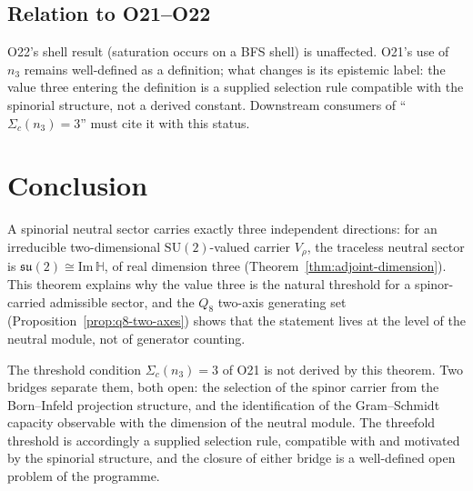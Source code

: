 \documentclass[11pt,a4paper]{article}
\newcommand{\ImH}{\mathrm{Im}\,\mathbb{H}}
\newcommand{\su}{\mathfrak{su}}
\newcommand{\SU}{\mathrm{SU}}
\begin{document}
  \subsection{Relation to O21--O22}
    \label{ssec:conditional}

    O22's shell result (saturation occurs on a BFS shell) is unaffected.
    O21's use of $n_{3}$ remains well-defined as a definition; what changes is its
    epistemic label: the value three entering the definition is a supplied selection
    rule compatible with the spinorial structure, not a derived constant.
    Downstream consumers of ``$\Sigma_{c}(n_{3}) = 3$'' must cite it with this status.

  \section{Conclusion}
  \label{sec:conclusion}

  A spinorial neutral sector carries exactly three independent directions: for an
  irreducible two-dimensional $\SU(2)$-valued carrier $V_{\rho}$, the traceless neutral sector is
  $\su(2) \cong \ImH$, of real dimension three
  (Theorem~\ref{thm:adjoint-dimension}).
  This theorem explains why the value three is the natural threshold for a spinor-carried
  admissible sector, and the $Q_{8}$ two-axis generating set
  (Proposition~\ref{prop:q8-two-axes}) shows that the statement lives at the level of the
  neutral module, not of generator counting.

  The threshold condition $\Sigma_{c}(n_{3}) = 3$ of O21 is not derived by this theorem.
  Two bridges separate them, both open: the selection of the spinor carrier from the
  Born--Infeld projection structure, and the identification of the Gram--Schmidt capacity
  observable with the dimension of the neutral module.
  The threefold threshold is accordingly a supplied selection rule, compatible with and
  motivated by the spinorial structure, and the closure of either bridge is a
  well-defined open problem of the programme.
\end{document}
